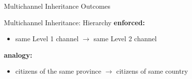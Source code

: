\begin{frame}{Multichannel Inheritance Outcomes}
  
\end{frame}

\begin{frame}{Multichannel Inheritance: Hierarchy}%
  \textbf{enforced:}
  \begin{itemize}
    \item same Level 1 channel $\rightarrow$ same Level 2 channel
  \end{itemize}

  \vspace{2ex}
  \textbf{analogy:}
  \begin{itemize}
    \item citizens of the same province $\rightarrow$ citizens of same country
  \end{itemize}

\end{frame}
